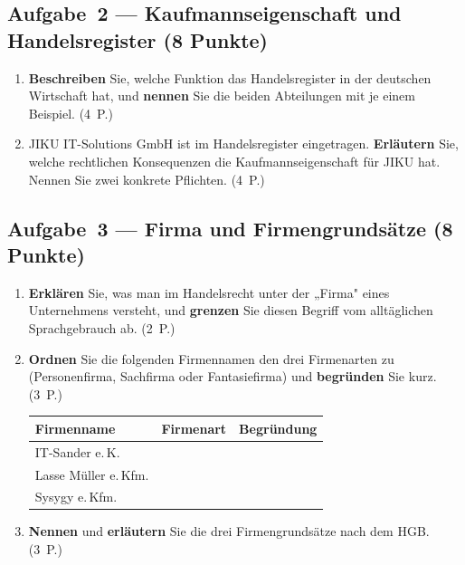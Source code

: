 \documentclass[11pt, a4paper]{article}
\begin{document}
\subsection*{Aufgabe~2 --- Kaufmannseigenschaft und Handelsregister (8 Punkte)}

\begin{enumerate}[label=(\alph*)]
  \item \textbf{Beschreiben} Sie, welche Funktion das Handelsregister in der deutschen Wirtschaft hat,
  und \textbf{nennen} Sie die beiden Abteilungen mit je einem Beispiel. \hfill (4~P.)

  \vspace{5cm}

  \item JIKU IT-Solutions GmbH ist im Handelsregister eingetragen. \textbf{Erläutern} Sie, welche
  rechtlichen Konsequenzen die Kaufmannseigenschaft für JIKU hat. Nennen Sie zwei konkrete
  Pflichten. \hfill (4~P.)

  \vspace{4cm}
\end{enumerate}

\subsection*{Aufgabe~3 --- Firma und Firmengrundsätze (8 Punkte)}

\begin{enumerate}[label=(\alph*)]
  \item \textbf{Erklären} Sie, was man im Handelsrecht unter der „Firma" eines Unternehmens versteht,
  und \textbf{grenzen} Sie diesen Begriff vom alltäglichen Sprachgebrauch ab. \hfill (2~P.)

  \vspace{3cm}

  \item \textbf{Ordnen} Sie die folgenden Firmennamen den drei Firmenarten zu (Personenfirma, Sachfirma
  oder Fantasiefirma) und \textbf{begründen} Sie kurz. \hfill (3~P.)

  \bigskip

  \noindent
  \begin{tabular}{|p{4.5cm}|p{3.5cm}|p{5cm}|}
  \hline
  \textbf{Firmenname} & \textbf{Firmenart} & \textbf{Begründung}\\
  \hline
  IT-Sander e.\,K. & & \\[0.8cm]
  \hline
  Lasse Müller e.\,Kfm. & & \\[0.8cm]
  \hline
  Sysygy e.\,Kfm. & & \\[0.8cm]
  \hline
  \end{tabular}

  \bigskip

  \item \textbf{Nennen} und \textbf{erläutern} Sie die drei Firmengrundsätze nach dem HGB. \hfill (3~P.)

  \vspace{5cm}
\end{enumerate}
\end{document}
